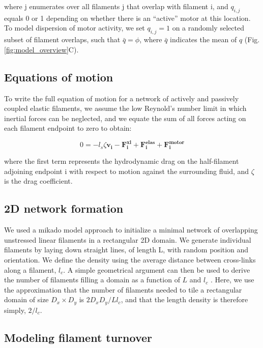 \documentclass[10pt,letterpaper]{article}
\begin{document}
where j enumerates over all filaments j that overlap with filament i, and $q_{i,j}$ equals 0 or 1 depending on whether there is an ``active'' motor at this location. To model dispersion of motor activity, we set $q_{i,j}=1$  on a randomly selected subset of filament overlaps, such that $\bar{q}=\phi$, where $\bar{q}$ indicates the mean of $q$ (Fig. \ref{fig:model_overview}C).

\subsection*{Equations of motion}

To write the full equation of motion for a network of actively and passively coupled elastic filaments, we assume the low Reynold's number limit in which inertial forces can be neglected, and we equate the sum of all forces acting on each filament endpoint to zero to obtain:

\begin{equation}
\label{eqn:syst3}
0=-l_s\zeta\mathbf{ v_i} -\mathbf{F^{xl}_i}+ \mathbf{F^{elas}_i}+\mathbf{F^{motor}_i} 
\end{equation}

where the first term represents the hydrodynamic drag on the half-filament adjoining endpoint i with respect to motion against the surrounding fluid, and $\zeta$ is the drag coefficient.

\subsection*{2D network formation}

We used a mikado model approach \cite{Unterberger2014} to initialize a minimal network of overlapping unstressed linear filaments in a rectangular 2D domain. We generate individual filaments by laying down straight lines, of length L, with random position and orientation. We define the density using the average distance between cross-links along a filament, $l_c$. A simple geometrical argument can then be used to derive the number of filaments filling a domain as a function of $L$ and $l_c$ \cite{theo_hlm}.  Here, we use the approximation that the number of filaments needed to tile a rectangular domain of size $D_x \times D_y$  is $2D_xD_y/Ll_c$, and that the length density is therefore simply, $2/l_c$. 

\subsection*{Modeling filament turnover}
\end{document}

